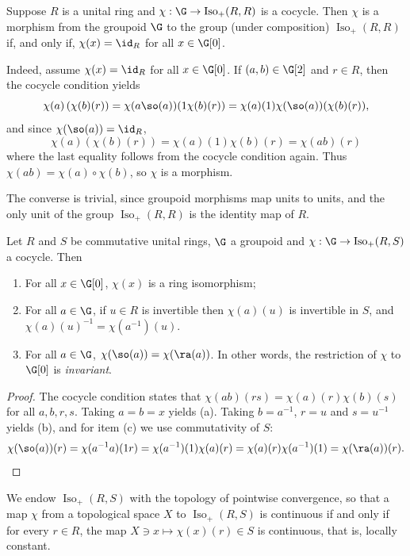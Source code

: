 \begin{example}
Suppose $R$ is a unital ring and $\chi:\G\to\operatorname{Iso}_+(R,R)$ is a cocycle. Then $\chi$ is a morphism from the groupoid $\G$ to the group (under composition) $\operatorname{Iso}_+(R,R)$ if, and only if, $\chi(x)=\id_R$ for all $x\in \G[0]$.

Indeed, assume $\chi(x)=\id_R$ for all $x\in\G[0]$. If $(a,b)\in\G[2]$ and $r\in R$, then the cocycle condition yields
\[\chi(a)\left(\chi(b)(r)\right)=\chi(a\so(a))(1\chi(b)(r))=\chi(a)(1)\chi(\so(a))(\chi(b)(r)),\]
and since $\chi(\so(a))=\id_R$,
\[\chi(a)\left(\chi(b)(r)\right)=\chi(a)(1)\chi(b)(r)=\chi(ab)(r)\]
where the last equality follows from the cocycle condition again. Thus $\chi(ab)=\chi(a)\circ\chi(b)$, so $\chi$ is a morphism.

The converse is trivial, since groupoid morphisms map units to units, and the only unit of the group $\operatorname{Iso}_+(R,R)$ is the identity map of $R$.
\end{example}

\begin{proposition}
Let $R$ and $S$ be commutative unital rings, $\G$ a groupoid and $\chi:\G\to\operatorname{Iso}_+(R,S)$ a cocycle. Then
\begin{enumerate}
\item[(a)] For all $x\in\G[0]$, $\chi(x)$ is a ring isomorphism;
\item[(b)] For all $a\in\G$, if $u\in R$ is invertible then $\chi(a)(u)$ is invertible in $S$, and $\chi(a)(u)^{-1}=\chi(a^{-1})(u)$.
\item[(c)] For all $a\in\G$, $\chi(\so(a))=\chi(\ra(a))$. In other words, the restriction of $\chi$ to $\G[0]$ is \emph{invariant}.
\end{enumerate}
\end{proposition}
\begin{proof}
The cocycle condition states that $\chi(ab)(rs)=\chi(a)(r)\chi(b)(s)$ for all $a,b,r,s$. Taking $a=b=x$ yields (a). Taking $b=a^{-1}$, $r=u$ and $s=u^{-1}$ yields (b), and for item (c) we use commutativity of $S$:
\[\chi(\so(a))(r)=\chi(a^{-1}a)(1r)=\chi(a^{-1})(1)\chi(a)(r)=\chi(a)(r)\chi(a^{-1})(1)=\chi(\ra(a))(r).\qedhere\]
\end{proof}

We endow $\operatorname{Iso}_+(R,S)$ with the topology of pointwise convergence, so that a map $\chi$ from a topological space $X$ to $\operatorname{Iso}_+(R,S)$ is continuous if and only if for every $r\in R$, the map $X\ni x\mapsto\chi(x)(r)\in S$ is continuous, that is, locally constant.


